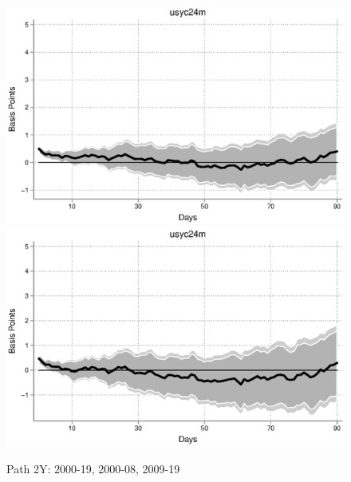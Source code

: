 \documentclass{article}
\begin{document}
\begin{figure}[tbph]
\begin{center}
	\end{center}
\end{figure}

\pagebreak[4]

\begin{figure}[tbph]
	\begin{center}
		\caption{Path 2Y: 2000-19, 2000-08, 2009-19}
		\includegraphics[trim={0cm 0cm 0cm 0cm},clip,height=0.3\textheight,width=1\textwidth]{../LagDep-FX/Path/US/usyc24m00-19path.eps} \\
		\includegraphics[trim={0cm 0cm 0cm 0cm},clip,height=0.3\textheight,width=1\textwidth]{../LagDep-FX/Path/US/usyc24m00-08path.eps} \\

\end{center}
\end{figure}
\end{document}
